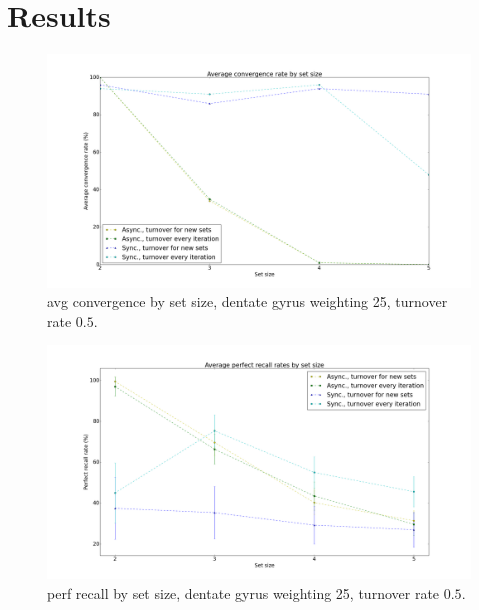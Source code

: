 \section{Results}

\begin{figure}[h!]
    \centering
    \includegraphics[width=14cm]{fig/avg_convergence_rate.png}
    \caption{avg convergence by set size, dentate gyrus weighting 25, turnover rate $0.5$.}
    \label{fig:avg_convergence_rate}
\end{figure}

\begin{figure}[h!]
    \centering
    \includegraphics[width=14cm]{fig/avg_perfect_recall_rates.png}
    \caption{perf recall by set size, dentate gyrus weighting 25, turnover rate $0.5$.}
    \label{fig:avg_perfect_recall_rates}
\end{figure}


